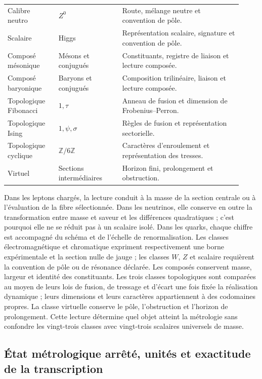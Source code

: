 \begin{table}[!htbp]
\begin{tabular}{p{0.20\linewidth}p{0.25\linewidth}p{0.47\linewidth}}
\\
Calibre neutro & \(Z^0\) & Route, mélange neutre et convention de pôle.
\\
Scalaire
 & Higgs
 & Représentation scalaire, signature et convention de pôle.
\\
Composé mésonique
 & Mésons et conjugués
 & Constituants, registre de liaison et lecture composée.
\\
Composé baryonique
 & Baryons et conjugués
 & Composition trilinéaire, liaison et lecture composée.
\\
Topologique Fibonacci
 & \(1,\tau\) & Anneau de fusion et dimension de Frobenius--Perron.
\\
Topologique Ising
 & \(1,\psi,\sigma\) & Règles de fusion et représentation sectorielle.
\\
Topologique cyclique
 & \(\mathbb Z/6\mathbb Z\) & Caractères d’enroulement et représentation des tresses.
\\
Virtuel
 & Sections intermédiaires & Horizon fini, prolongement et obstruction.
\\
\bottomrule
\end{tabular}
\end{table}
\endgroup

Dans les leptons chargés, la lecture conduit à la masse de la section centrale
ou à l’évaluation de la fibre sélectionnée. Dans les neutrinos, elle conserve en outre
la transformation entre masse et saveur et les différences quadratiques ; c’est pourquoi
elle ne se réduit pas à un scalaire isolé. Dans les quarks, chaque chiffre est accompagné du
schéma et de l’échelle de renormalisation. Les classes électromagnétique et
chromatique expriment respectivement une borne expérimentale et la section nulle
de jauge ; les classes \(W\), \(Z\) et scalaire requièrent la convention de pôle
ou de résonance déclarée. Les composés conservent masse, largeur et identité
des constituants. Les trois classes topologiques sont comparées au moyen de leurs
lois de fusion, de tressage et d’écart une fois fixée la réalisation dynamique ;
leurs dimensions et leurs caractères appartiennent à des codomaines propres. La classe
virtuelle conserve le pôle, l’obstruction et l’horizon de prolongement. Cette
lecture détermine quel objet atteint la métrologie sans confondre les
vingt-trois classes avec vingt-trois scalaires universels de masse.


\subsection{État métrologique arrêté, unités et exactitude de la transcription
}
\label{subsec:vi-corte-metrologico}

